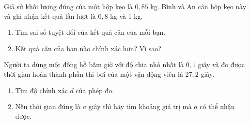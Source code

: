 \begin{vd}
	Giả sử khối lượng đúng của một hộp kẹo là $0{,}85$ kg. Bình và An cân hộp kẹo này và ghi nhận kết quả lần lượt là $0{,}8$ kg và $1$ kg.
	\begin{enumerate}
		\item Tìm sai số tuyệt đối của kết quả cân của mỗi bạn.
		\item Kết quả cân của bạn nào chính xác hơn? Vì sao?
	\end{enumerate}
\end{vd}
\begin{vd}
	Người ta dùng một đồng hồ bấm giờ với độ chia nhỏ nhất là $0{,}1$ giây và đo được thời gian hoàn thành phần thi bơi của một vận động viên là $27{,}2$ giây.
	\begin{enumerate}
		\item Tìm độ chính xác $d$ của phép đo.
		\item Nếu thời gian đúng là $a$ giây thì hãy tìm khoảng giá trị mà $a$ có thể nhận được.
	\end{enumerate}
\end{vd}

